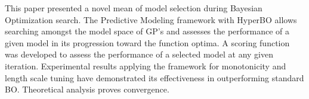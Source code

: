 \documentclass{article}
\begin{document}
This paper presented a novel mean of model selection during Bayesian Optimization search. The Predictive Modeling framework with HyperBO allows searching amongst the model space of GP's and assesses the performance of a given model in its progression toward the function optima. A scoring function was developed to assess the performance of a selected model at any given iteration. Experimental results applying the framework for monotonicity and length scale tuning have demonstrated its effectiveness in outperforming standard BO. Theoretical analysis proves convergence. \iffalse In addition applying model selection via HyperBO allows information about the black box function to be extracted during the optimization process. \fi



\end{document}
